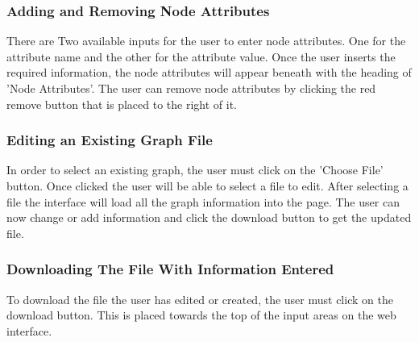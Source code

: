 \documentclass[english]{article}
\begin{document}
\subsubsection{Adding and Removing Node Attributes}
There are Two available inputs for the user to enter node attributes. One for the attribute name and the other for the attribute value. Once the user inserts the required information, the node attributes will appear beneath with the heading of 'Node Attributes'. The user can remove node attributes by clicking the red remove button that is placed to the right of it.

\subsubsection{Editing an Existing Graph File}
In order to select an existing graph, the user must click on the 'Choose File' button. Once clicked the user will be able to select a file to edit. After selecting a file the interface will load all the graph information into the page. The user can now change or add information and click the download button to get the updated file.

\subsubsection{Downloading The File With Information Entered}
To download the file the user has edited or created, the user must click on the download button. This is placed towards the top of the input areas on the web interface.
\end{document}
